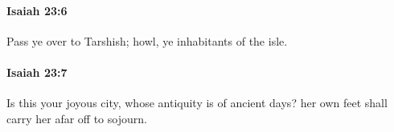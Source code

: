 		\paragraph{Isaiah 23:6} %
			\label{ISAIAH-23-6}

			Pass ye over to Tarshish; howl, ye inhabitants of the isle.


		\paragraph{Isaiah 23:7} %
			\label{ISAIAH-23-7}

			Is this your joyous city, whose antiquity is of ancient days? her own feet shall carry her afar off to sojourn.


